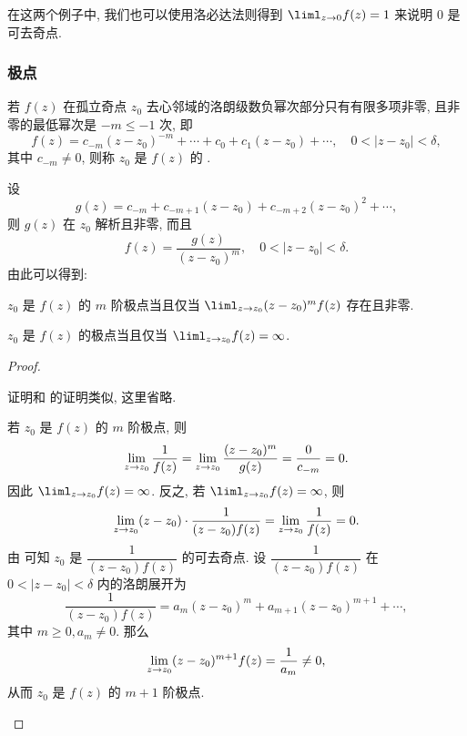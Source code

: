 在这两个例子中, 我们也可以使用洛必达法则得到 $\liml_{z\ra 0}f(z)=1$ 来说明 $0$ 是可去奇点.


\subsubsection{极点}

\begin{definition}
  若 $f(z)$ 在孤立奇点 $z_0$ 去心邻域的洛朗级数负幂次部分只有有限多项非零, 且非零的最低幂次是 $-m\le-1$ 次, 即
  \[
    f(z)=c_{-m}(z-z_0)^{-m}+\cdots+c_0+c_1(z-z_0)+\cdots,\quad  0<|z-z_0|<\delta,
  \]
  其中 $c_{-m}\neq 0$, 则称 $z_0$ 是 $f(z)$ 的 .\footnotemark
\end{definition}

设
\[
  g(z)=c_{-m}+c_{-m+1}(z-z_0)+c_{-m+2}(z-z_0)^2+\cdots,
\]
则 $g(z)$ 在 $z_0$ 解析且非零, 而且
\[
  f(z)=\dfrac{g(z)}{(z-z_0)^m},\quad 0<|z-z_0|<\delta.
\]
由此可以得到:

\begin{theorem}
  \label{thm:test-pole}
  \begin{enumpar}
    \item $z_0$ 是 $f(z)$ 的 $m$ 阶极点当且仅当 $\liml_{z\ra z_0}(z-z_0)^mf(z)$ 存在且非零.
    \item $z_0$ 是 $f(z)$ 的极点当且仅当 $\liml_{z\ra z_0}f(z)=\infty$.
  \end{enumpar}
\end{theorem}

\begin{proof}
  \begin{enumnopar}
    \item 证明和 的证明类似, 这里省略.
    \item 若 $z_0$ 是 $f(z)$ 的 $m$ 阶极点, 则
      \[
         \lim_{z\rightarrow z_0}\frac1{f(z)}
        =\lim_{z\rightarrow z_0}\frac{(z-z_0)^m}{g(z)}
        =\frac{0}{c_{-m}}=0.
      \]
      因此 $\liml_{z\ra z_0}f(z)=\infty$.
      反之, 若 $\liml_{z\ra z_0}f(z)=\infty$, 则
      \[
         \lim_{z\rightarrow z_0}(z-z_0)\cdot\frac1{(z-z_0)f(z)}
        =\lim_{z\rightarrow z_0}\frac1{f(z)}=0.
      \]
      由 可知 $z_0$ 是 $\dfrac 1{(z-z_0)f(z)}$ 的可去奇点.
      设 $\dfrac 1{(z-z_0)f(z)}$ 在 $0<|z-z_0|<\delta$ 内的洛朗展开为
      \[
        \frac1{(z-z_0)f(z)}=a_m(z-z_0)^m+a_{m+1}(z-z_0)^{m+1}+\cdots,
      \]
      其中 $m\ge0,a_m\neq 0$.
      那么
      \[
        \lim_{z\rightarrow z_0}(z-z_0)^{m+1} f(z)=\frac1{a_m}\neq 0,
      \]
      从而 $z_0$ 是 $f(z)$ 的 $m+1$ 阶极点.\qedhere
  \end{enumnopar}
\end{proof}


